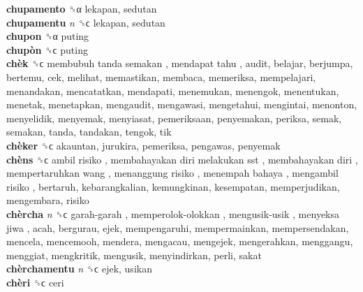 \textbf{chupamento} ␝α  lekapan, sedutan  \\
\textbf{chupamentu} \emph{n}  ␝ϲ  lekapan, sedutan  \\
\textbf{chupon} ␝α  puting  \\
\textbf{chupòn} ␝ϲ  puting  \\
\textbf{chèk} ␝ϲ   membubuh tanda semakan ,  mendapat tahu , audit, belajar, berjumpa, bertemu, cek, melihat, memastikan, membaca, memeriksa, mempelajari, menandakan, mencatatkan, mendapati, menemukan, menengok, menentukan, menetak, menetapkan, mengaudit, mengawasi, mengetahui, mengintai, menonton, menyelidik, menyemak, menyiasat, pemeriksaan, penyemakan, periksa, semak, semakan, tanda, tandakan, tengok, tik  \\
\textbf{chèker} ␝ϲ  akauntan, jurukira, pemeriksa, pengawas, penyemak  \\
\textbf{chèns} ␝ϲ   ambil risiko ,  membahayakan diri melakukan sst ,  membahayakan diri ,  mempertaruhkan wang ,  menanggung risiko ,  menempah bahaya ,  mengambil risiko , bertaruh, kebarangkalian, kemungkinan, kesempatan, memperjudikan, mengembara, risiko  \\
\textbf{chèrcha} \emph{n}  ␝ϲ   garah-garah ,  memperolok-olokkan ,  mengusik-usik ,  menyeksa jiwa , acah, bergurau, ejek, mempengaruhi, mempermainkan, mempersendakan, mencela, mencemooh, mendera, mengacau, mengejek, mengerahkan, menggangu, menggiat, mengkritik, mengusik, menyindirkan, perli, sakat  \\
\textbf{chèrchamentu} \emph{n}  ␝ϲ  ejek, usikan  \\
\textbf{chèri} ␝ϲ  ceri  \\
